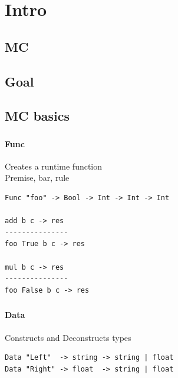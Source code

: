 \section{Intro}
\subsection{MC}

\subsection{Goal}

\subsection{MC basics}

\begin{frame}[fragile]
   \frametitle{\subsecname}
   \framesubtitle{Func}

   Creates a runtime function\\
   Premise, bar, rule
   \begin{lstlisting}
Func "foo" -> Bool -> Int -> Int -> Int

add b c -> res
---------------
foo True b c -> res

mul b c -> res
---------------
foo False b c -> res
   \end{lstlisting}
\end{frame}

\begin{frame}[fragile]
   \frametitle{\subsecname}
   \framesubtitle{Data}

   Constructs and Deconstructs types
   \begin{lstlisting}
Data "Left"  -> string -> string | float
Data "Right" -> float  -> string | float
   \end{lstlisting}
\end{frame}

